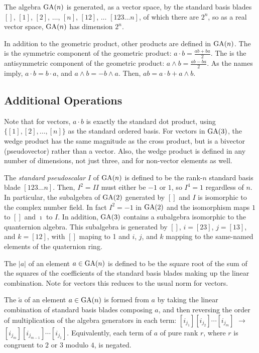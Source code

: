 \documentclass{amsproc}
\theoremstyle{definition}
\theoremstyle{remark}
\numberwithin{equation}{section}
\begin{document}
The algebra $\mathop{\mathrm{GA}}(n)$ is generated, as a vector space, by the standard
basis blades $[]$, $[1]$, $[2]$, $\dots$, $[n]$, $[12]$, $\dots$
$[123\dots{n}]$, of which there are $2^n$, so as a real vector
space, $\mathop{\mathrm{GA}}(n)$ has dimension $2^n$.

In addition to the geometric product, other products are defined in
$\mathop{\mathrm{GA}}(n)$.  The  is the symmetric component of the
geometric product: $a\cdot{b} = \frac{ab+ba}{2}$.  The  is the antisymmetric component of the geometric product:
$a\wedge{b}=\frac{ab-ba}{2}$.  As the names imply,
$a\cdot{b}=b\cdot{a}$, and $a\wedge{b} = -b\wedge{a}$.  Then, $ab =
a\cdot{b} + a\wedge{b}$.

\subsection{Additional Operations}

Note that for vectors, $a\cdot{b}$ is exactly the standard dot
product, using $\{[1], [2], \dots, [n]\}$ as the standard ordered
basis.  For vectors in $\mathop{\mathrm{GA}}(3)$, the wedge product has the same
magnitude as the cross product, but is a bivector (pseudovector)
rather than a vector.  Also, the wedge product is defined in any
number of dimensions, not just three, and for non-vector elements as
well.

The \emph{standard pseudoscalar} $I$ of $\mathop{\mathrm{GA}}(n)$ is defined to be the
rank-$n$ standard basis blade $[123\dots{n}]$.  Then, $I^2 = II$ must
either be $-1$ or $1$, so $I^4=1$ regardless of $n$.  In particular,
the subalgebra of $\mathop{\mathrm{GA}}(2)$ generated by $[]$ and $I$ is isomorphic to
the complex number field.  In fact $I^2=-1$ in $\mathop{\mathrm{GA}}(2)$ and the
isomorphism maps $1$ to $[]$ and $\imath$ to $I$.  In addition,
$\mathop{\mathrm{GA}}(3)$ contains a subalgebra isomorphic to the quanternion algebra.
This subalgebra is generated by $[]$, $i=[23]$, $j=[13]$, and
$k=[12]$, with $[]$ maping to 1 and $i$, $j$, and $k$ mapping to the
same-named elements of the quaternion ring.

The  $|a|$ of an element $a\in\mathop{\mathrm{GA}}(n)$ is defined to be the
square root of the sum of the squares of the coefficients of the
standard basis blades making up the linear combination.  Note for
vectors this reduces to the usual norm for vectors.

The  $\tilde{a}$ of an element $a\in \mathop{\mathrm{GA}}(n)$ is formed
from $a$ by taking the linear combination of standard basis blades
composing $a$, and then reversing the order of multiplication of the
algebra generators in each term: $[i_{j_1}][i_{j_2}]\cdots[i_{j_m}]$
$\rightarrow$ $[i_{j_m}][i_{j_{m-1}}]\cdots[i_{j_1}]$.  Equivalently,
each term of $a$ of pure rank $r$, where $r$ is congruent to $2 $ or
$3$ modulo $4$, is negated.
\end{document}
